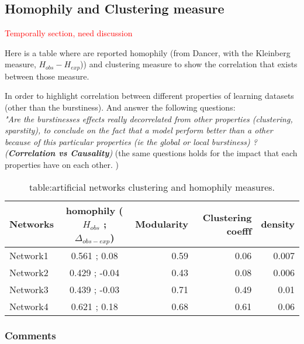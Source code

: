 \documentclass[a4paper, 12pt]{article}
\begin{document}
\subsection{Homophily and Clustering measure }
\textcolor{red}{Temporally section, need discussion}

Here is a  table where are reported homophily (from Dancer, with the Kleinberg measure, $H_{obs} - H_{exp}$)) and clustering measure to show the correlation that exists between those measure. 

In order to highlight correlation between different properties of learning datasets (other than the burstiness). And answer the following questions: ~\\

\hspace{1cm}\textit{"Are the burstinesses effects really decorrelated from other properties (clustering, sparstity), to conclude on the fact that a model perform better than a other because of this particular properties (ie the global or local burstiness) ? (\textbf{Correlation \emph{vs} Causality}) } (the same questions holds for the impact that each properties have on each other. ) 

\begin{table}[h] 
\centering
	\caption{table:artificial networks clustering and homophily measures.}
	\begin{tabular}{lcrrr}
		\hline
		Networks   &  homophily ($H_ {obs}$ ; $\Delta_{obs - exp}$)    &  Modularity & Clustering coefff & density   \\
		\hline
		Network1  & 0.561 ;  0.08  &0.59  & 0.06 & 0.007  \\
		Network2  & 0.429 ; -0.04  &0.43  & 0.08 & 0.006 \\
		Network3  & 0.439 ; -0.03  &0.71  & 0.49 & 0.01 \\
		Network4  & 0.621 ;  0.18  &0.68  & 0.61 & 0.06 \\
		\hline
	\end{tabular}
\label{table:artificial_networks_hom}
\end{table}

\subsubsection{Comments}
\end{document}
